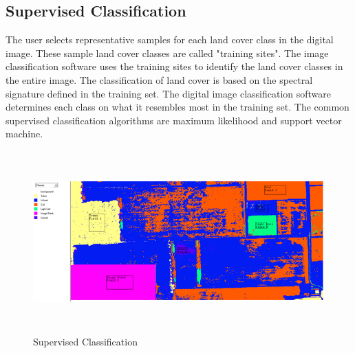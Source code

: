 \documentclass[document.tex]{subfiles}
\begin{document}
\subsection{Supervised Classification}
\noindent The user selects representative samples for each land cover class in the digital image.
These sample land cover classes are called "training sites". The image classification
software uses the training sites to identify the land cover classes in the entire image.
The classification of land cover is based on the spectral signature defined in the training set. The digital image classification software determines each class on what it resembles most in the training set. The common supervised classification algorithms are maximum
likelihood\cite{19} and support vector machine\cite{18}.
\vspace{1.5 cm}
\begin{figure}[H]
	\begin{center}
		\includegraphics[height=7.0cm]{imgs/Supervised.png}
	\end{center}
	\caption{Supervised Classification}
	\label{fig: Supervised Classification}
\end{figure}
\end{document}
